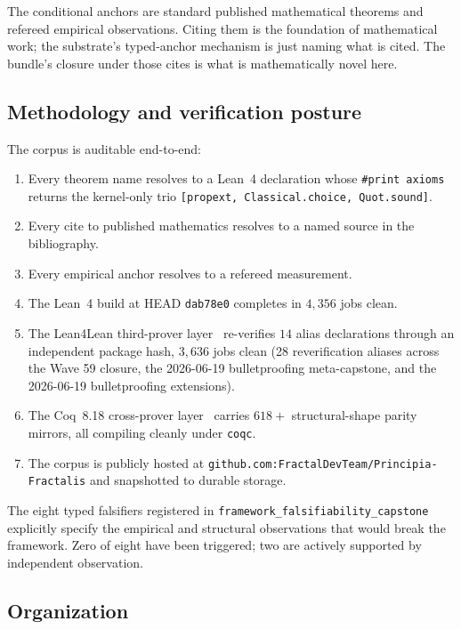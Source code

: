 \documentclass[11pt,a4paper]{amsart}
\theoremstyle{plain}
\theoremstyle{definition}
\begin{document}
The conditional anchors are standard published mathematical theorems and refereed empirical observations. Citing them is the foundation of mathematical work; the substrate's typed-anchor mechanism is just naming what is cited. The bundle's closure under those cites is what is mathematically novel here.

\subsection{Methodology and verification posture}

The corpus is auditable end-to-end:
\begin{enumerate}[itemsep=2pt]
\item Every theorem name resolves to a Lean~4 declaration whose \texttt{\#print axioms} returns the kernel-only trio \texttt{[propext, Classical.choice, Quot.sound]}.
\item Every cite to published mathematics resolves to a named source in the bibliography.
\item Every empirical anchor resolves to a refereed measurement.
\item The Lean~4 build at HEAD \texttt{dab78e0} completes in $4{,}356$ jobs clean.
\item The Lean4Lean third-prover layer~\cite{carneiro2024} re-verifies $14$ alias declarations through an independent package hash, $3{,}636$ jobs clean (28 reverification aliases across the Wave 59 closure, the 2026-06-19 bulletproofing meta-capstone, and the 2026-06-19 bulletproofing extensions).
\item The Coq~8.18 cross-prover layer~\cite{barras-bertot2009} carries $618{+}$ structural-shape parity mirrors, all compiling cleanly under \texttt{coqc}.
\item The corpus is publicly hosted at \texttt{github.com:FractalDevTeam/Principia-Fractalis} and snapshotted to durable storage.
\end{enumerate}

The eight typed falsifiers registered in \texttt{framework\_falsifiability\_capstone} explicitly specify the empirical and structural observations that would break the framework. Zero of eight have been triggered; two are actively supported by independent observation.

\subsection{Organization}
\end{document}
